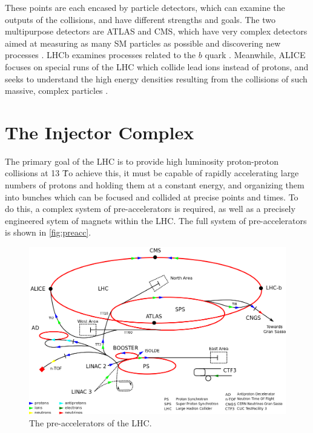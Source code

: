 These points are each encased by particle detectors, which can examine the outputs of the collisions, and have different strengths and goals. The two multipurpose detectors are \ac{ATLAS} and \ac{CMS}, which have very complex detectors aimed at measuring as many \ac{SM} particles as possible and discovering new processes \cite{PERF-2007-01, 1748-0221-3-08-S08004}. \ac{LHCb} examines processes related to the $b$ quark \cite{1748-0221-3-08-S08005}. Meanwhile, \ac{ALICE} focuses on special runs of the \ac{LHC} which collide lead ions instead of protons, and seeks to understand the high energy densities resulting from the collisions of such massive, complex particles \cite{1748-0221-3-08-S08002}. 


\section{The Injector Complex}
\label{sec:lhc_inj}

The primary goal of the \ac{LHC} is to provide high luminosity proton-proton collisions at 13 \tev\. %
To achieve this, it must be capable of rapidly accelerating large numbers of protons and holding them at a constant energy, and organizing them into bunches which can be focused and collided at precise points and times. To do this, a complex system of pre-accelerators is required, as well as a precisely engineered sytem of magnets within the \ac{LHC}. The full system of pre-accelerators is shown in \autoref{fig:preacc}.

\begin{centering}
\begin{figure}[!hbt]
\myfloatalign
\includegraphics[width=.90\linewidth]{figures/lhc/Cern-accelerator-complex.png}
\caption{The pre-accelerators of the \ac{LHC}.}
\label{fig:preacc}
\end{figure}
\end{centering}

